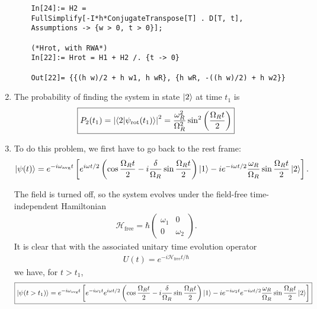 \documentclass{article}
\theoremstyle{definition}
\newcommand{\ham}{\mathcal{H}}
\newcommand{\f}[2]{\frac{#1}{#2}}
\newcommand{\lp}{\left(}
\newcommand{\rp}{\right)}
\newcommand{\lb}{\left[}
\newcommand{\rb}{\right]}
\begin{document}
\begin{enumerate}[label=\alph*)]
\begin{lstlisting}
	In[24]:= H2 = 
	FullSimplify[-I*h*ConjugateTranspose[T] . D[T, t], 
	Assumptions -> {w > 0, t > 0}];
	
	(*Hrot, with RWA*)
	In[22]:= Hrot = H1 + H2 /. {t -> 0}
	
	Out[22]= {{(h w)/2 + h w1, h wR}, {h wR, -((h w)/2) + h w2}}
	\end{lstlisting}
	
	
	\item 
	
	
	The probability of finding the system in state $\ket{2}$ at time $t_1$ is 
	\begin{align*}
	\boxed{P_2(t_1) = \abs{\bra{2}\ket{\psi_\text{rot}(t_1)}}^2 = \f{\omega_R^2}{\Omega_R^2}\sin^2 \lp \f{\Omega_R t}{2} \rp}
	\end{align*}
	
	
	
	
	\item To do this problem, we first have to go back to the rest frame:
	\begin{align*}
	\ket{\psi(t)} = e^{-i\omega_\text{avg}t }\lb e^{i\omega t/2} \lp \cos\f{\Omega_R t}{2} - i\f{\delta}{\Omega_R} \sin\f{\Omega_R t}{2}   \rp \ket{1} - i e^{-i\omega t/2}\f{\omega_R}{\Omega_R} \sin\f{\Omega_R t}{2} \ket{2}\rb.
	\end{align*}
	
	The field is turned off, so the system evolves under the field-free time-independent Hamiltonian 
	\begin{align*}
	\ham_\text{free} = \hbar \begin{pmatrix}
	\omega_1 & 0 \\ 0 & \omega_2
	\end{pmatrix}.
	\end{align*}
	It is clear that with the associated unitary time evolution operator
	\begin{align*}
	U(t) = e^{-i \ham_\text{free} t /\hbar} 
	\end{align*}
	we have, for $t > t_1$,
	\begin{align*}
	\boxed{\ket{\psi(t > t_1)} = e^{-i\omega_\text{avg}t }\lb e^{-i\omega_1 t} e^{i\omega t/2} \lp \cos\f{\Omega_R t}{2} - i\f{\delta}{\Omega_R} \sin\f{\Omega_R t}{2}   \rp \ket{1} - i e^{-i\omega_2 t} e^{-i\omega t/2}\f{\omega_R}{\Omega_R} \sin\f{\Omega_R t}{2} \ket{2}\rb}
	\end{align*}
\end{enumerate}
	
	
	
	
	
\end{document}
